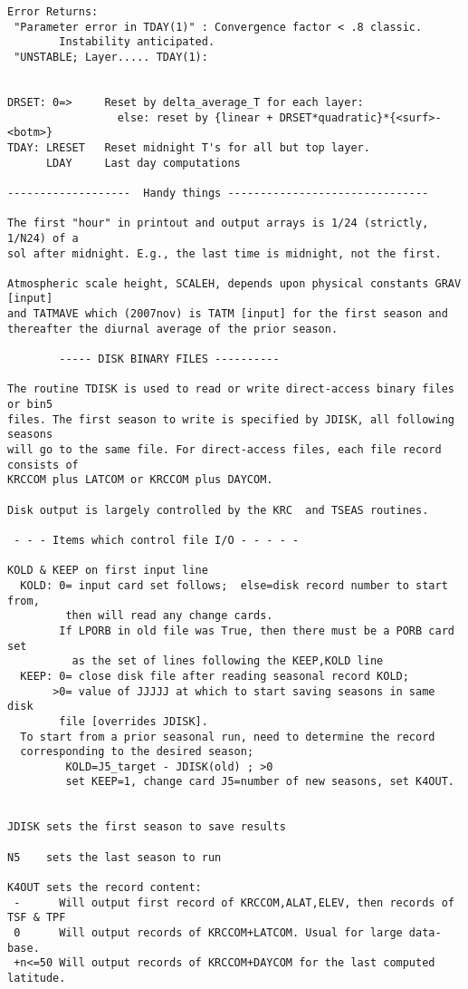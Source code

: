 \begin{verbatim}
Error Returns:
 "Parameter error in TDAY(1)" : Convergence factor < .8 classic. 
        Instability anticipated.  
 "UNSTABLE; Layer..... TDAY(1): 


DRSET: 0=>     Reset by delta_average_T for each layer:
                 else: reset by {linear + DRSET*quadratic}*{<surf>-<botm>}
TDAY: LRESET   Reset midnight T's for all but top layer.
      LDAY     Last day computations

-------------------  Handy things -------------------------------

The first "hour" in printout and output arrays is 1/24 (strictly, 1/N24) of a
sol after midnight. E.g., the last time is midnight, not the first.

Atmospheric scale height, SCALEH, depends upon physical constants GRAV [input] 
and TATMAVE which (2007nov) is TATM [input] for the first season and 
thereafter the diurnal average of the prior season.

        ----- DISK BINARY FILES ----------

The routine TDISK is used to read or write direct-access binary files or bin5
files. The first season to write is specified by JDISK, all following seasons
will go to the same file. For direct-access files, each file record consists of
KRCCOM plus LATCOM or KRCCOM plus DAYCOM.

Disk output is largely controlled by the KRC  and TSEAS routines.

 - - - Items which control file I/O - - - - -

KOLD & KEEP on first input line
  KOLD: 0= input card set follows;  else=disk record number to start from,
         then will read any change cards.
        If LPORB in old file was True, then there must be a PORB card set 
          as the set of lines following the KEEP,KOLD line
  KEEP: 0= close disk file after reading seasonal record KOLD;
       >0= value of JJJJJ at which to start saving seasons in same disk 
        file [overrides JDISK].
  To start from a prior seasonal run, need to determine the record 
  corresponding to the desired season;
         KOLD=J5_target - JDISK(old) ; >0
         set KEEP=1, change card J5=number of new seasons, set K4OUT.


JDISK sets the first season to save results

N5    sets the last season to run

K4OUT sets the record content:
 -      Will output first record of KRCCOM,ALAT,ELEV, then records of TSF & TPF
 0      Will output records of KRCCOM+LATCOM. Usual for large data-base.
 +n<=50 Will output records of KRCCOM+DAYCOM for the last computed latitude.


\end{verbatim}
